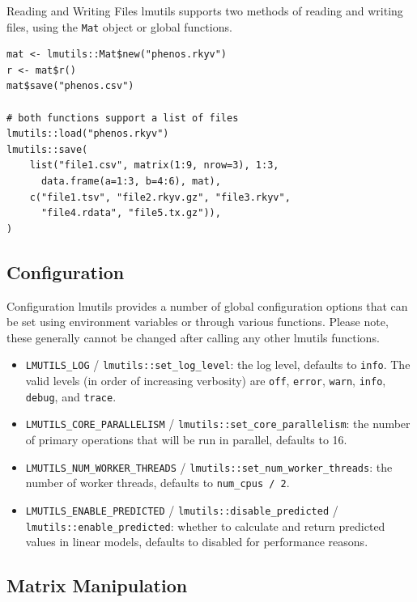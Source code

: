 \documentclass[10pt,handout]{beamer}
\begin{document}
\begin{frame}[fragile]{Reading and Writing Files}
  lmutils supports two methods of reading and writing files, using the \texttt{Mat} object or global functions.
  \begin{verbatim}
mat <- lmutils::Mat$new("phenos.rkyv")
r <- mat$r()
mat$save("phenos.csv")

# both functions support a list of files
lmutils::load("phenos.rkyv")
lmutils::save(
    list("file1.csv", matrix(1:9, nrow=3), 1:3,
      data.frame(a=1:3, b=4:6), mat),
    c("file1.tsv", "file2.rkyv.gz", "file3.rkyv",
      "file4.rdata", "file5.tx.gz")),
)
\end{verbatim}
\end{frame}

\subsection{Configuration}

\begin{frame}{Configuration}
  lmutils provides a number of global configuration options that can be set using environment variables or through various functions. Please note, these generally cannot be changed after calling any other lmutils functions.
  \begin{itemize}[<+->]
    \item \texttt{LMUTILS\_LOG} / \texttt{lmutils::set\_log\_level}: the log level, defaults to \texttt{info}. The valid levels (in order of increasing verbosity) are \texttt{off}, \texttt{error}, \texttt{warn}, \texttt{info}, \texttt{debug}, and \texttt{trace}.
    \item \texttt{LMUTILS\_CORE\_PARALLELISM} / \texttt{lmutils::set\_core\_parallelism}: the number of primary operations that will be run in parallel, defaults to 16.
    \item \texttt{LMUTILS\_NUM\_WORKER\_THREADS} / \texttt{lmutils::set\_num\_worker\_threads}: the number of worker threads, defaults to \texttt{num\_cpus / 2}.
    \item \texttt{LMUTILS\_ENABLE\_PREDICTED} / \texttt{lmutils::disable\_predicted} / \texttt{lmutils::enable\_predicted}: whether to calculate and return predicted values in linear models, defaults to disabled for performance reasons.
  \end{itemize}
\end{frame}

\subsection{Matrix Manipulation}
\end{document}
